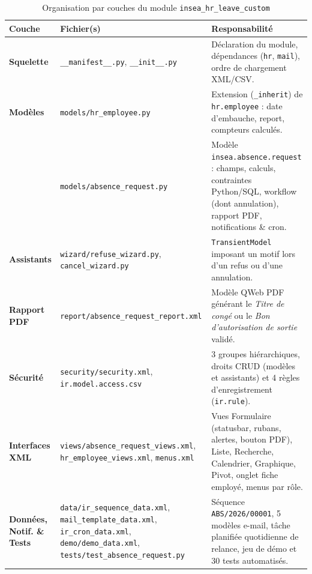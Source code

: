 \documentclass[11pt,a4paper]{article}
\begin{document}
\begin{table}[H]
\centering
\caption{Organisation par couches du module \texttt{insea\_hr\_leave\_custom}}
\label{tab:arch}
\small
\begin{tabularx}{\textwidth}{>{\bfseries}p{2.3cm} >{\raggedright\arraybackslash\footnotesize}p{5.5cm} Y}
\toprule
Couche & Fichier(s) & Responsabilité \\
\midrule
Squelette & \texttt{\_\_manifest\_\_.py}, \texttt{\_\_init\_\_.py} & Déclaration du module, dépendances (\texttt{hr}, \texttt{mail}), ordre de chargement XML/CSV. \\
Modèles & \texttt{models/hr\_employee.py} & Extension (\texttt{\_inherit}) de \texttt{hr.employee} : date d'embauche, report, compteurs calculés. \\
 & \texttt{models/absence\_request.py} & Modèle \texttt{insea.absence.request} : champs, calculs, contraintes Python/SQL, workflow (dont annulation), rapport PDF, notifications \& cron. \\
Assistants & \texttt{wizard/refuse\_wizard.py}, \texttt{cancel\_wizard.py} & \texttt{TransientModel} imposant un motif lors d'un refus ou d'une annulation. \\
Rapport PDF & \texttt{report/absence\_request\_report.xml} & Modèle QWeb PDF générant le \textit{Titre de congé} ou le \textit{Bon d'autorisation de sortie} validé. \\
Sécurité & \texttt{security/security.xml}, \texttt{ir.model.access.csv} & 3 groupes hiérarchiques, droits CRUD (modèles et assistants) et 4 règles d'enregistrement (\texttt{ir.rule}). \\
Interfaces XML & \texttt{views/absence\_request\_views.xml}, \texttt{hr\_employee\_views.xml}, \texttt{menus.xml} & Vues Formulaire (statusbar, rubans, alertes, bouton PDF), Liste, Recherche, Calendrier, Graphique, Pivot, onglet fiche employé, menus par rôle. \\
Données, Notif. \& Tests & \texttt{data/ir\_sequence\_data.xml}, \texttt{mail\_template\_data.xml}, \texttt{ir\_cron\_data.xml}, \texttt{demo/demo\_data.xml}, \texttt{tests/test\_absence\_request.py} & Séquence \texttt{ABS/2026/00001}, 5 modèles e-mail, tâche planifiée quotidienne de relance, jeu de démo et 30 tests automatisés. \\
\bottomrule
\end{tabularx}
\end{table}
\end{document}
